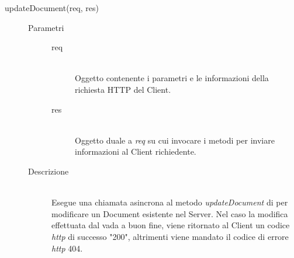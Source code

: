 \begin{description}
\begin{description}
 \item[updateDocument(req, res)] \hfill 
 \begin{description}
 \item[Parametri] \hfill
  \begin{description}
   \item[req] \hfill \\
   Oggetto contenente i parametri e le informazioni della richiesta HTTP del Client.
   \item[res] \hfill \\
   Oggetto duale a \textit{req} su cui invocare i metodi per inviare informazioni al Client richiedente.
  \end{description}
 \item[Descrizione] \hfill \\
 Esegue una chiamata asincrona al metodo \textit{updateDocument} di  per modificare un Document esistente nel Server. Nel caso la modifica effettuata dal  vada a buon fine, viene ritornato al Client un codice \textit{http} di successo "200", altrimenti viene mandato il codice di errore \textit{http} 404.
 \end{description}
 

\end{description}
\end{description}
